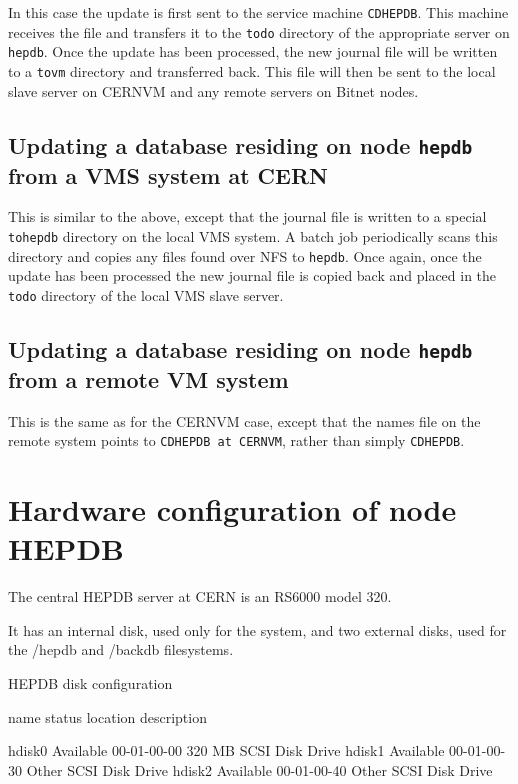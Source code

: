 In this case the update is first sent to the service machine {\tt CDHEPDB}.
This machine receives the file and transfers it to the {\tt todo} directory
of the appropriate server on {\tt hepdb}. Once the update has been processed,
the new journal file will be written to a {\tt tovm} directory and transferred
back. This file will then be sent to the local slave server on CERNVM and
any remote servers on Bitnet nodes.

\section{Updating a database residing on node {\tt hepdb} from a VMS system at CERN}

This is similar to the above, except that the journal file is written to a special
{\tt tohepdb} directory on the local VMS system. A batch job periodically scans
this directory and copies any files found over NFS to {\tt hepdb}. Once again,
once the update has been processed the new journal file is copied back and placed
in the {\tt todo} directory of the local VMS slave server.

\section{Updating a database residing on node {\tt hepdb} from a remote VM system}

This is the same as for the CERNVM case, except that the names file on the remote
system points to {\tt CDHEPDB at CERNVM}, rather than simply {\tt CDHEPDB}.

\chapter{Hardware configuration of node HEPDB}

The central HEPDB server at CERN is an RS6000 model 320.

It has an internal disk, used only for the system, and
two external disks, used for the /hepdb and /backdb filesystems.

\begin{XMPt}{HEPDB disk configuration}

name   status    location    description

hdisk0 Available 00-01-00-00 320 MB SCSI Disk Drive
hdisk1 Available 00-01-00-30 Other SCSI Disk Drive
hdisk2 Available 00-01-00-40 Other SCSI Disk Drive

\end{XMPt}
